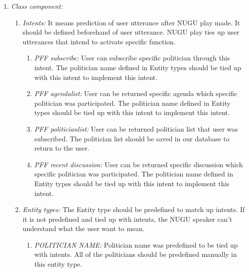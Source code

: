 \documentclass[conference]{IEEEtran}
\begin{document}
\begin{enumerate}
  \item \textit{Class component: } 
  	 \begin{enumerate}
	\item \textit {Intents: }  It means prediction of user utterance after NUGU play made. It should be defined beforehand of user utterance. NUGU play ties up user utterances that intend to activate specific function.\
	 \begin{enumerate}
	\item \textit {PFF subscribe: } User can subscribe specific politician through this intent. The politician name defined in Entity types should be tied up with this intent to implement this intent.
	\item \textit {PFF agendalist:} User can be returned specific agenda which specific politician was participated. The politician name defined in Entity types should be tied up with this intent to implement this intent.
	\item \textit {PFF politicianlist:} User can be returned politician list that user was subscribed. The politician list should be saved in our database to return to the user.
	\item \textit {PFF recent discussion:} User can be returned specific discussion which specific politician was participated. The politician name defined in Entity types should be tied up with this intent to implement this intent.\\
	  \end{enumerate}

	\item \textit {Entity types: }  The Entity type should be predefined to match up intents. If it is not predefined and tied up with intents, the NUGU speaker can’t understand what the user want to mean.\
	 \begin{enumerate}
	\item \textit {POLITICIAN NAME: } Politician name was predefined to be tied up with intents. All of the politicians should be predefined manually in this entity type.
	  \end{enumerate}
	  

\end{enumerate}
\end{enumerate}
\end{document}

